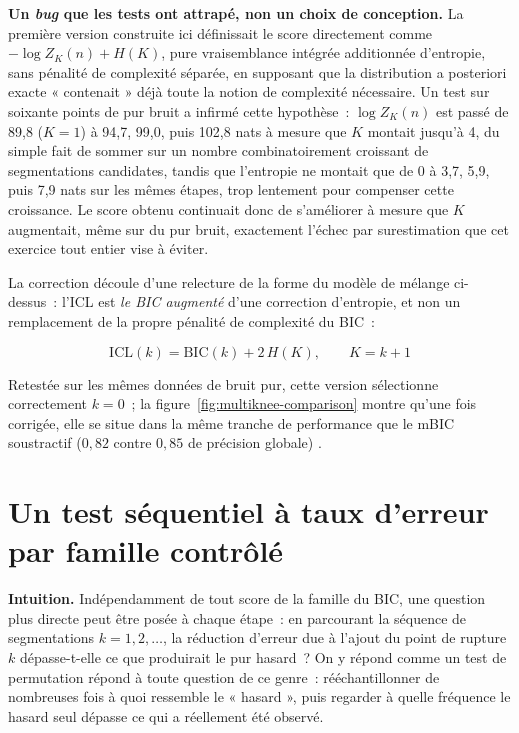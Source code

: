 \documentclass[11pt]{article}
\begin{document}
\textbf{Un \emph{bug} que les tests ont attrapé, non un choix de conception.}
La première version construite ici définissait le score directement comme
$-\log Z_K(n) + H(K)$, pure vraisemblance intégrée additionnée d'entropie,
sans pénalité de complexité séparée, en supposant que la distribution a
posteriori exacte « contenait » déjà toute la notion de complexité
nécessaire. Un test sur soixante points de pur bruit a infirmé cette
hypothèse~: $\log Z_K(n)$ est passé de 89,8 ($K=1$) à 94,7, 99,0, puis
102,8 nats à mesure que $K$ montait jusqu'à 4, du simple fait de sommer sur
un nombre combinatoirement croissant de segmentations candidates, tandis
que l'entropie ne montait que de 0 à 3,7, 5,9, puis 7,9 nats sur les mêmes
étapes, trop lentement pour compenser cette croissance. Le score obtenu
continuait donc de s'améliorer à mesure que $K$ augmentait, même sur du pur
bruit, exactement l'échec par surestimation que cet exercice tout entier
vise à éviter.

La correction découle d'une relecture de la forme du modèle de mélange
ci-dessus~: l'ICL est \emph{le BIC augmenté} d'une correction d'entropie,
et non un remplacement de la propre pénalité de complexité du BIC~:

\begin{equation}
\mathrm{ICL}(k) = \mathrm{BIC}(k) + 2\,H(K), \qquad K = k+1
\end{equation}

Retestée sur les mêmes données de bruit pur, cette version sélectionne
correctement $k = 0$~; la figure~\ref{fig:multiknee-comparison} montre
qu'une fois corrigée, elle se situe dans la même tranche de performance
que le mBIC soustractif ($0{,}82$ contre $0{,}85$ de précision globale)
\citep{biernacki2000}.

\section{Un test séquentiel à taux d'erreur par famille contrôlé}
\label{sec:fwer}

\textbf{Intuition.} Indépendamment de tout score de la famille du BIC, une
question plus directe peut être posée à chaque étape~: en parcourant la
séquence de segmentations $k = 1, 2, \dots$, la réduction d'erreur due à
l'ajout du point de rupture $k$ dépasse-t-elle ce que produirait le pur
hasard~? On y répond comme un test de permutation répond à toute question
de ce genre~: rééchantillonner de nombreuses fois à quoi ressemble le
« hasard », puis regarder à quelle fréquence le hasard seul dépasse ce qui
a réellement été observé.
\end{document}
